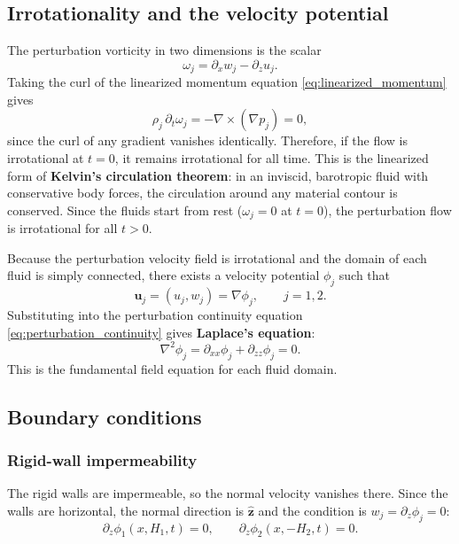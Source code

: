 \documentclass[11pt,a4paper]{article}
\begin{document}
\subsection{Irrotationality and the velocity potential}

The perturbation vorticity in two dimensions is the scalar
\begin{equation}
    \omega_j = \partial_x w_j - \partial_z u_j.
\end{equation}
Taking the curl of the linearized momentum equation \eqref{eq:linearized_momentum} gives
\begin{equation}
    \rho_j\,\partial_t\omega_j
    =
    -\nabla\times(\nabla p_j)
    =
    0,
\end{equation}
since the curl of any gradient vanishes identically.  Therefore, if the flow is irrotational at $t=0$, it remains irrotational for all time.  This is the linearized form of \textbf{Kelvin's circulation theorem}: in an inviscid, barotropic fluid with conservative body forces, the circulation around any material contour is conserved.  Since the fluids start from rest ($\omega_j=0$ at $t=0$), the perturbation flow is irrotational for all $t>0$.

Because the perturbation velocity field is irrotational and the domain of each fluid is simply connected, there exists a velocity potential $\phi_j$ such that
\begin{equation}
    \bm{u}_j = (u_j,w_j)=\nabla \phi_j,
    \qquad j=1,2.
    \label{eq:velocity_potential_def}
\end{equation}
Substituting into the perturbation continuity equation \eqref{eq:perturbation_continuity} gives \textbf{Laplace's equation}:
\begin{equation}
    \boxed{
    \nabla^2\phi_j
    =
    \partial_{xx}\phi_j+\partial_{zz}\phi_j=0.
    }
    \label{eq:laplace_potential}
\end{equation}
This is the fundamental field equation for each fluid domain.

\subsection{Boundary conditions}

\subsubsection{Rigid-wall impermeability}

The rigid walls are impermeable, so the normal velocity vanishes there.  Since the walls are horizontal, the normal direction is $\hat{\bm{z}}$ and the condition is $w_j = \partial_z\phi_j = 0$:
\begin{equation}
    \partial_z\phi_1(x,H_1,t)=0,
    \qquad
    \partial_z\phi_2(x,-H_2,t)=0.
    \label{eq:potential_wall_conditions}
\end{equation}
\end{document}
